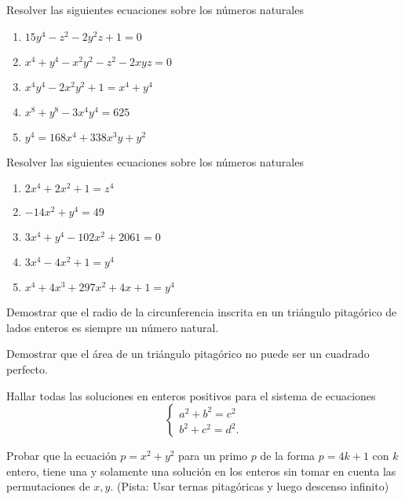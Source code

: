 \begin{exercise}
    Resolver las siguientes ecuaciones sobre los números naturales
    \begin{multicols}{2}
        \begin{enumerate}
            \item $15y^4 - z^2 - 2y^2 z + 1 = 0$
            \item $x^4 + y^4 - x^2 y^2 - z^2 - 2xyz = 0$
            \item $x^4 y^4 - 2x^2 y^2 + 1 = x^4 + y^4$
            \item $x^8 + y^8 - 3x^{4}y^4 = 625$
            \item $y^4 = 168x^4 + 338x^3 y + y^2$
        \end{enumerate}
    \end{multicols}
\end{exercise}

\begin{exercise}
    Resolver las siguientes ecuaciones sobre los números naturales
    \begin{multicols}{2}
        \begin{enumerate}
            \item $2x^4 + 2x^2 + 1 = z^4$
            \item $-14x^2 + y^4 = 49$
            \item $3x^4 + y^4 - 102x^2 + 2061 = 0$
            \item $3x^4 - 4x^2 + 1 = y^4$
            \item $x^4 + 4x^3 + 297x^2 + 4x + 1 = y^4$
        \end{enumerate}
    \end{multicols}
\end{exercise}

\begin{problem}
    Demostrar que el radio de la circunferencia inscrita en un triángulo pitagórico de lados enteros es siempre un número natural.
\end{problem}

\begin{problem}
    Demostrar que el área de un triángulo pitagórico no puede ser un cuadrado perfecto.
\end{problem}

\begin{problem}
    Hallar todas las soluciones en enteros positivos para el sistema de ecuaciones
    \[
        \begin{cases}
            a^2 + b^2 = c^2\\
            b^2 + c^2 = d^2.
        \end{cases}
    \]
\end{problem}

\begin{problem}
    Probar que la ecuación $p = x^2 + y^2$ para un primo $p$ de la forma $p = 4k + 1$ con $k$ entero, tiene una y
    solamente una solución en los enteros sin tomar en cuenta las permutaciones de $x,y$.
    (Pista: Usar ternas pitagóricas y luego descenso infinito)
\end{problem}